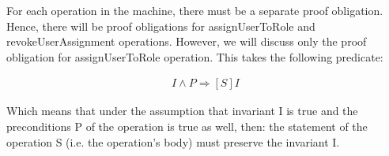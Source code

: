 For each operation in the machine, there must be a separate proof obligation.  Hence, there will be proof obligations for assignUserToRole and revokeUserAssignment operations.  However, we will discuss only the proof obligation for assignUserToRole operation.  This takes the following predicate: 

\begin{align*}
I \wedge P \Rightarrow [S] I
\end{align*}



Which means that under the assumption that invariant I is true and the preconditions P of the operation is true as well, then: the statement of the operation S (i.e. the operation’s body) must preserve the invariant I.

